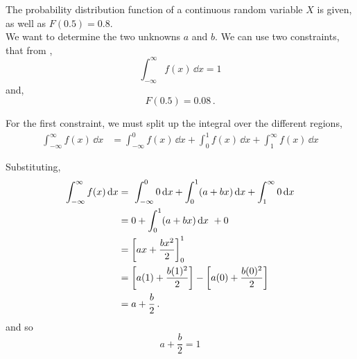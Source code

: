 %
%

\begin{subquestions}
	
\subquestion

\begin{subsubquestions}
	
\subsubquestion
The probability distribution function of a continuous random variable $X$ is given, as well as $F(0.5)=0.8.$ \\

We want to determine the two unknowns $a$ and $b$. We can use two constraints, that from , 
\begin{equation}
	 \int_{-\infty}^{\infty} f(x)\,\dd x = 1
\end{equation}
and,
\begin{equation}
	F(0.5) = 0.08\,.
\end{equation}

For the first constraint, we must split up the integral over the different regions,
\begin{align}
\int_{-\infty}^{\infty} f(x)\,\dd x&=\int_{-\infty}^{0} f(x)\,\dd x+ \int_{0}^{1} f(x)\,\dd x + \int_{1}^{\infty} f(x)\,\dd x 
\end{align}

Substituting, 
\begin{align}
\int_{-\infty}^{\infty} f(x)\,\mathrm{d} x&=\ \int_{-\infty}^{0} 0\,\mathrm{d} x+ \int_{0}^{1} (a+bx)\,\mathrm{d} x + \int_{1}^{\infty} 0\,\mathrm{d} x  \nonumber \\
	&=0+ \int_{0}^{1} (a+bx)\,\mathrm{d} x ~+ 0  \nonumber \\
	&=\left[ax + \frac{bx^2}{2}\right]_0^1  \nonumber \\
	&=\left[a(1) + \frac{b(1)^2}{2}\right] - \left[a(0) + \frac{b(0)^2}{2}\right]\nonumber \\
	&= a + \frac{b}{2}  \,.
\end{align}
and so
\begin{equation}
	a + \frac{b}{2}  = 1 \label{2015:q4:eqn:crv1}
\end{equation}


\end{subsubquestions}
\end{subquestions}
